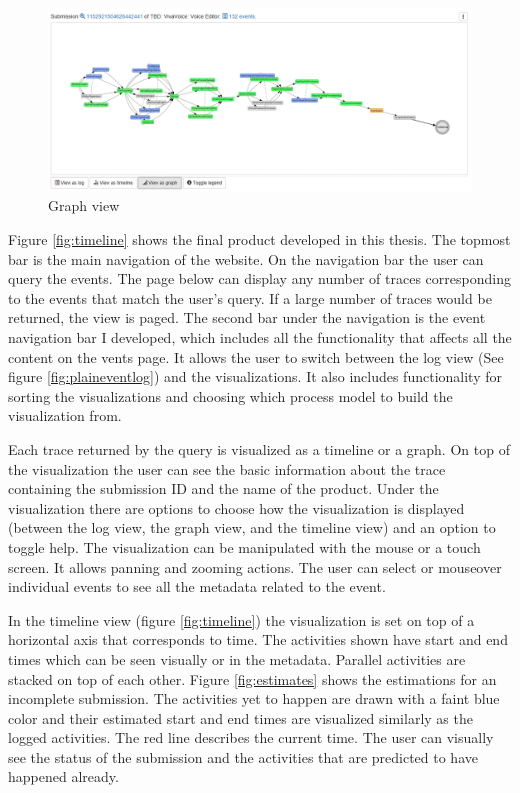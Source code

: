 \begin{figure}[htb]
\centering \includegraphics[width=\linewidth]{gfx/graph.png}
\caption{Graph view \label{fig:graph}}
\end{figure}

Figure \ref{fig:timeline} shows the final product developed in this thesis.
The topmost bar is the main navigation of the website.
On the navigation bar the user can query the events.
The page below can display any number of traces corresponding to the events that match the user's query.
If a large number of traces would be returned, the view is paged.
The second bar under the navigation is the event navigation bar I developed, which includes all the functionality that affects all the content on the vents page.
It allows the user to switch between the log view (See figure \ref{fig:plaineventlog}) and the visualizations.
It also includes functionality for sorting the visualizations and choosing which process model to build the visualization from.

Each trace returned by the query is visualized as a timeline or a graph. On top of the visualization the user can see the basic information about the trace containing the submission ID and the name of the product.
Under the visualization there are options to choose how the visualization is displayed (between the log view, the graph view, and the timeline view) and an option to toggle help.
The visualization can be manipulated with the mouse or a touch screen. It allows panning and zooming actions.
The user can select or mouseover individual events to see all the metadata related to the event.

In the timeline view (figure \ref{fig:timeline}) the visualization is set on top of a horizontal axis that corresponds to time. The activities shown have start and end times which can be seen visually or in the metadata.
Parallel activities are stacked on top of each other.
Figure \ref{fig:estimates} shows the estimations for an incomplete submission.
The activities yet to happen are drawn with a faint blue color and their estimated start and end times are visualized similarly as the logged activities.
The red line describes the current time.
The user can visually see the status of the submission and the activities that are predicted to have happened already.


